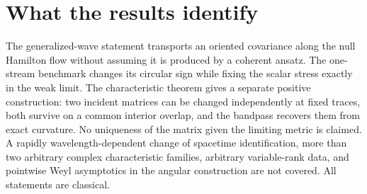 \documentclass[11pt]{article}
\begin{document}
\section{What the results identify}
The generalized-wave statement transports an oriented covariance along the null Hamilton flow without assuming it is produced by a coherent ansatz. The one-stream benchmark changes its circular sign while fixing the scalar stress exactly in the weak limit. The characteristic theorem gives a separate positive construction: two incident matrices can be changed independently at fixed traces, both survive on a common interior overlap, and the bandpass recovers them from exact curvature. No uniqueness of the matrix given the limiting metric is claimed. A rapidly wavelength-dependent change of spacetime identification, more than two arbitrary complex characteristic families, arbitrary variable-rank data, and pointwise Weyl asymptotics in the angular construction are not covered. All statements are classical.
\end{document}
